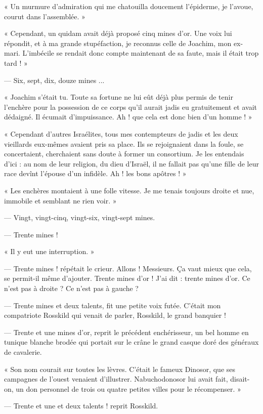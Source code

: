 \documentclass[a4paper, 11pt, oneside, polutonikogreek, french]{article}
\begin{document}
« Un murmure d'admiration qui me chatouilla doucement l'épiderme, je l'avoue, courut dans l'assemblée. »

« Cependant, un quidam avait déjà proposé cinq mines d'or. Une voix lui répondit, et à ma grande stupéfaction, je reconnus celle de Joachim, mon ex-mari. L'imbécile se rendait donc compte maintenant de sa faute, mais il était trop tard ! »

--- Six, sept, dix, douze mines ...

« Joachim s'était tu. Toute sa fortune ne lui eût déjà plus permis de tenir l'enchère pour la possession de ce corps qu'il aurait jadis eu gratuitement et avait dédaigné. Il écumait d'impuissance. Ah ! que cela est donc bien d'un homme ! »

« Cependant d'autres Israélites, tous mes contempteurs de jadis et les deux vieillards eux-mêmes avaient pris sa place. Ils se rejoignaient dans la foule, se concertaient, cherchaient sans doute à former un consortium. Je les entendais d'ici : au nom de leur religion, du dieu d'Israël, il ne fallait pas qu'une fille de leur race devînt l'épouse d'un infidèle. Ah ! les bons apôtres ! »

« Les enchères montaient à une folle vitesse. Je me tenais toujours droite et nue, immobile et semblant ne rien voir. »

--- Vingt, vingt-cinq, vingt-six, vingt-sept mines.

--- Trente mines !

« Il y eut une interruption. »

--- Trente mines ! répétait le crieur. Allons ! Messieurs. Ça vaut mieux que cela, se permit-il même d'ajouter. Trente mines d'or ! J'ai dit : trente mines d'or. Ce n'est pas à droite ? Ce n'est pas à gauche ?

--- Trente mines et deux talents, fit une petite voix futée. C'était mon compatriote Rosskild qui venait de parler, Rosskild, le grand banquier !

--- Trente et une mines d'or, reprit le précédent enchérisseur, un bel homme en tunique blanche brodée qui portait sur le crâne le grand casque doré des généraux de cavalerie.

« Son nom courait sur toutes les lèvres. C'était le fameux Dinosor, que ses campagnes de l'ouest venaient d'illustrer. Nabuchodonosor lui avait fait, disait-on, un don personnel de trois ou quatre petites villes pour le récompenser. »

--- Trente et une et deux talents ! reprit Rosskild.
\end{document}
